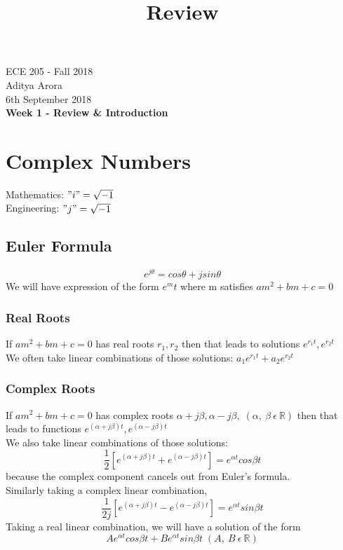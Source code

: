 \documentclass[11pt]{article}
\theoremstyle{definition}
\newcommand{\R}{\mathbb{R}}
\begin{document}
\title{Review}
\thispagestyle{empty}

\begin{center}
{\vspace{5mm} \LARGE ECE 205 - Fall 2018 \\ \vspace{5mm}Aditya Arora\\ \vspace{5mm} 6th September 2018}\\
{\vspace{5mm} \LARGE \bf Week 1 - Review \& Introduction}

\end{center}

\section{Complex Numbers}
Mathematics: $"i" = \sqrt{-1}$\\
Engineering: $"j" = \sqrt{-1}$
\subsection{Euler Formula}
$$e^{j\theta} = cos\theta + jsin\theta$$
We will have expression of the form $e^mt$ where m satisfies $am^2 + bm + c = 0$
\subsubsection{Real Roots}
If $am^2 + bm + c = 0$ has real roots $r_1, r_2$ then that leads to solutions $e^{r_1t}, e^{r_2t}$\\
We often take linear combinations of those solutions: $a_1e^{r_1t} + a_2e^{r_2t}$

\subsubsection{Complex Roots}
If $am^2 + bm + c = 0$ has complex roots $\alpha + j\beta, \alpha - j\beta, \;(\alpha,\: \beta\: \epsilon\: \R)$ then that leads to functions $e^{(\alpha + j\beta)t}, e^{(\alpha - j\beta)t}$\\
We also take linear combinations of those solutions: $$\frac{1}{2}[e^{(\alpha + j\beta)t} + e^{(\alpha - j\beta)t}] = e^{\alpha t}cos\beta t$$ because the complex component cancels out from Euler's formula. \\
Similarly taking a complex linear combination, $$\frac{1}{2j}[e^{(\alpha + j\beta)t} - e^{(\alpha - j\beta)t}] = e^{\alpha t}sin\beta t$$
Taking a real linear combination, we will have a solution of the form
$$Ae^{\alpha t}cos\beta t + Be^{\alpha t}sin\beta t \; (A,\:B\: \epsilon\: \R)$$
\end{document}
